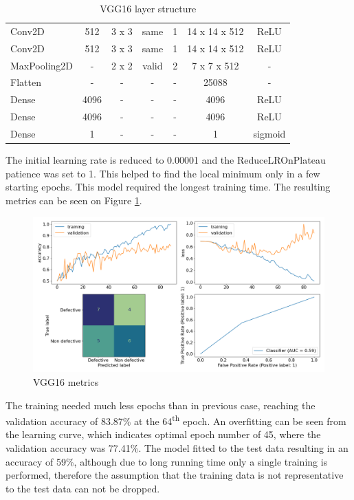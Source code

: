 \documentclass[10pt, final]{article}
\begin{document}
\begin{table}[!ht]
\begin{tabular}{l c c c c c c}
		Conv2D       & 512               & 3 x 3       & same    & 1      & 14 x 14 x 512   & ReLU       \\
		Conv2D       & 512               & 3 x 3       & same    & 1      & 14 x 14 x 512   & ReLU       \\
		MaxPooling2D & -                 & 2 x 2       & valid   & 2      & 7 x 7 x 512     & -          \\
		Flatten      & -                 & -           & -       & -      & 25088           & -          \\
		Dense        & 4096              & -           & -       & -      & 4096            & ReLU       \\
		Dense        & 4096              & -           & -       & -      & 4096            & ReLU       \\
		Dense        & 1                 & -           & -       & -      & 1               & sigmoid    \\
		\hline
	\end{tabular}
	\caption{VGG16 layer structure}
	\label{table:VGG16_struct}
\end{table}

The initial learning rate is reduced to 0.00001 and the ReduceLROnPlateau patience was set to 1.
This helped to find the local minimum only in a few starting epochs.
This model required the longest training time.
The resulting metrics can be seen on Figure \ref{fig:VGG16_metrics}.

\begin{figure}[!ht]
	\centering
	\includegraphics[width=\textwidth]{./tex_graphs/metrics_VGG16.png}
	\caption{VGG16 metrics}
	\label{fig:VGG16_metrics}
\end{figure}

The training needed much less epochs than in previous case, reaching the validation accuracy of 83.87\% at the
64\textsuperscript{th} epoch.
An overfitting can be seen from the learning curve, which indicates optimal epoch number of 45, where the
validation accuracy was 77.41\%.
The model fitted to the test data resulting in an accuracy of 59\%, although due to long running time only a single
training is performed, therefore the assumption that the training data is not representative to the test data
can not be dropped.
\end{document}
